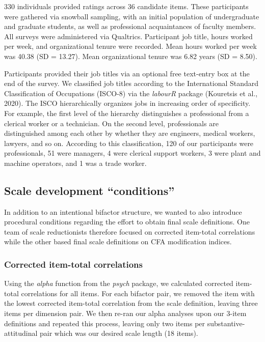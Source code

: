 \documentclass[
  english,
  man]{apa7}
\begin{document}
330 individuals provided ratings across 36 candidate items. These participants were gathered via snowball sampling, with an initial population of undergraduate and graduate students, as well as professional acquaintances of faculty members. All surveys were administered via Qualtrics. Participant job title, hours worked per week, and organizational tenure were recorded. Mean hours worked per week was 40.38 (SD = 13.27). Mean organizational tenure was 6.82 years (SD = 8.50).

Participants provided their job titles via an optional free text-entry box at the end of the survey. We classified job titles according to the International Standard Classification of Occupations (ISCO-8) via the \emph{labourR} package (Kouretsis et al., 2020). The ISCO hierarchically organizes jobs in increasing order of specificity. For example, the first level of the hierarchy distinguishes a professional from a clerical worker or a technician. On the second level, professionals are distinguished among each other by whether they are engineers, medical workers, lawyers, and so on. According to this classification, 120 of our participants were professionals, 51 were managers, 4 were clerical support workers, 3 were plant and machine operators, and 1 was a trade worker.

\hypertarget{scale-development-conditions}{%
\subsection{Scale development ``conditions''}\label{scale-development-conditions}}

In addition to an intentional bifactor structure, we wanted to also introduce procedural conditions regarding the effort to obtain final scale definitions. One team of scale reductionists therefore focused on corrected item-total correlations while the other based final scale definitions on CFA modification indices.

\hypertarget{corrected-item-total-correlations}{%
\subsubsection{Corrected item-total correlations}\label{corrected-item-total-correlations}}

Using the \emph{alpha} function from the \emph{psych} package, we calculated corrected item-total correlations for all items. For each bifactor pair, we removed the item with the lowest corrected item-total correlation from the scale definition, leaving three items per dimension pair. We then re-ran our alpha analyses upon our 3-item definitions and repeated this process, leaving only two items per substantive-attitudinal pair which was our desired scale length (18 items).
\end{document}
